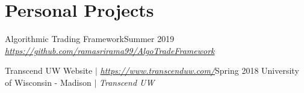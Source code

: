 \section{Personal Projects}
  \CVSubHeadingListStart
    \CVSubheading
      {Algorithmic Trading Framework}{Summer 2019}
      {{\emph{\small{\href{https://github.com/ramasrirama99/AlgoTradeFramework}{https://github.com/ramasrirama99/AlgoTradeFramework}}}}}{}
      

    \CVSubheading
      {Transcend UW Website $|$ \emph{\small{\href{https://www.transcenduw.com/}{https://www.transcenduw.com/}}}}{Spring 2018}
      {{University of Wisconsin - Madison} $|$ \emph{\small{Transcend UW}}}{}

  \CVSubHeadingListEnd